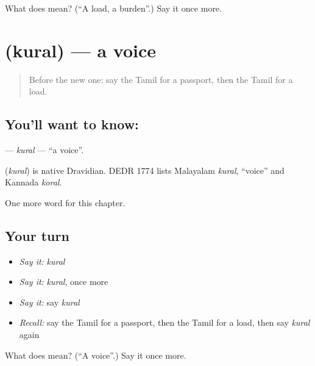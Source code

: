 \begin{tcolorbox}[breakable,colback=teal!4,colframe=teal!35!black,title={Before you move on}]
What does  mean? (\textquotedblleft{}A load, a burden\textquotedblright{}.) Say it once more.
\end{tcolorbox}
\section[\texorpdfstring{\ta{குரல்} (kural)}{குரல் (kural)}]{ (kural) — a voice}

\label{lesson:TA-C245-kural}



\begin{quote}
Before the new one: say the Tamil for a passport, then the Tamil for a load.
\end{quote}

\subsection*{You'll want to know: }
\textbf{} — \emph{kural} — \textquotedblleft{}a voice\textquotedblright{}.

\begin{cousinweb}
\textbf{} (\emph{kural}) is native Dravidian. DEDR 1774 lists Malayalam \emph{kural}, \textquotedblleft{}voice\textquotedblright{} and Kannada \emph{koral}.
\end{cousinweb}

\begin{grammarlens}[title={What you've built}]
One more word for this chapter.
\end{grammarlens}

\subsection*{Your turn}
\begin{itemize}
\raggedright
  \item \emph{Say it:} \emph{kural}
  \item \emph{Say it:} \emph{kural}, once more
  \item \emph{Say it:} say \emph{kural}
  \item \emph{Recall:} say the Tamil for a passport, then the Tamil for a load, then say \emph{kural} again
\end{itemize}

\begin{tcolorbox}[breakable,colback=teal!4,colframe=teal!35!black,title={Before you move on}]
What does  mean? (\textquotedblleft{}A voice\textquotedblright{}.) Say it once more.
\end{tcolorbox}

